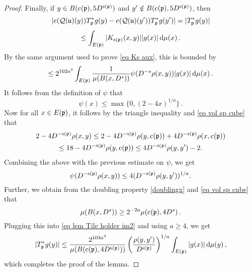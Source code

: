 {\begin{proof}
        Finally, if $y \in B(\mathrm{c}(\mathfrak p), 5D^{\mathrm{s}(\mathfrak p)})$ and $y' \notin B(\mathrm{c}(\mathfrak p), 5D^{\mathrm{s}(\mathfrak p)})$, then
        $$
            |e(\mathcal{Q}(\mathfrak u)(y)) T_{\mathfrak p}^* g(y) - e(\mathcal{Q}(\mathfrak u)(y')) T_{\mathfrak p}^* g(y')| = |T_{\mathfrak p}^* g(y)|
        $$
        $$
            \le \int_{E(\mathfrak p)} |K_{\mathrm{s}(\mathfrak p)}(x,y)| |g(x)| \, \mathrm{d}\mu(x)\,.
        $$
        By the same argument used to prove \eqref{eq Ks aux}, this is bounded by
        \begin{equation}
            \label{eq lem Tile holder im2}
            \le 2^{102a^3} \int_{E(\mathfrak p)} \frac{1}{\mu(B(x, D^s))} \psi(D^{-s} \rho(x,y)) |g(x)| \, \mathrm{d}\mu(x)\,.
        \end{equation}
        It follows from the definition of $\psi$ that
        $$
            \psi(x) \le \max\{0, (2  - 4x)^{1/a}\}\,.
        $$
        Now for all $x\in E(\mathfrak p)$, it follows by the triangle inequality and \eqref{eq vol sp cube} that
        \begin{multline*}
        2  - 4D^{-\mathrm{s}(\mathfrak p)}\rho(x,y)\leq 2  - 4D^{-\mathrm{s}(\mathfrak p)}\rho(y, \mathrm{c}(\mathfrak p)) + 4 D^{-\mathrm{s}(\mathfrak p)}\rho(x, \mathrm{c}(\mathfrak p))\\\leq 18 - 4 D^{-\mathrm{s}(\mathfrak p)} \rho(y, \mathrm{c}(\mathfrak p)) \leq 4 D^{-\mathrm{s}(\mathfrak p)}\rho(y,y') - 2 .
        \end{multline*}
        Combining the above with the previous estimate on $\psi$, we get
        $$
            \psi(D^{-\mathrm{s}(\mathfrak p)}\rho(x,y))  \le 4 (D^{-\mathrm{s}(\mathfrak p)}\rho(y,y'))^{1/a}.
        $$
        Further, we obtain from the doubling property \eqref{doublingx} and \eqref{eq vol sp cube} that
        $$
            \mu(B(x, D^s)) \ge 2^{-2a} \mu(\mathrm{c}(\mathfrak p), 4D^s)\,.
        $$
        Plugging this into \eqref{eq lem Tile holder im2} and using $a \ge 4$, we get
        $$
            |T_{\mathfrak p}^* g(y)| \le   \frac{2^{103a^3}}{\mu(B(\mathrm{c}(\mathfrak p), 4D^{\mathrm{s}(\mathfrak p)}))} \left(\frac{\rho(y,y')}{D^{\mathrm{s}(\mathfrak p)}}\right)^{1/a} \int_{E(\mathfrak p)} |g(x)| \, \mathrm{d}\mu(y)\,,
        $$
        which completes the proof of the lemma.
    \end{proof}

}
